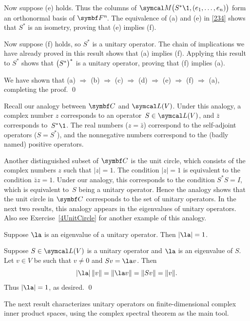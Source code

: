 Now suppose (e) holds. Thus the columns of $\M\paren[\big]{S^*\1, (e_1, \ldots, e_n)}$ form an orthonormal basis of $\FF{n}$. The equivalence of (a) and (e) in \ref{234} shows that $S^*$ is an isometry, proving that (e) implies (f).

Now suppose (f) holds, so $S^*$ is a unitary operator. The chain of implications we have already proved in this result shows that (a) implies (f). Applying this result to $S^*$ shows that $\paren[\big]{S^*}^*$ is a unitary operator, proving that (f) implies (a).

We have shown that (a) $\Rightarrow$ (b)  $\Rightarrow$ (c)  $\Rightarrow$ (d) $\Rightarrow$ (e) $\Rightarrow$ (f) $\Rightarrow$ (a), completing the proof.
\qed

Recall our analogy between $\C{}$ and $\L(V)$.  Under this analogy, a complex
number $z$ corresponds to an operator~$S \in \L(V)$, and $\bar{z}$ corresponds
to~$S^*\1$.  The real numbers \big($z = \bar{z}$\big) correspond to the self-adjoint operators \big($S = S^*$\big), and the
nonnegative numbers correspond to the (badly named) positive operators.

Another distinguished subset of $\C{}$ is the unit circle, which consists of the
complex numbers $z$ such that $|z| = 1$.  The condition $|z| = 1$ is equivalent to
the condition $\bar{z} z = 1$.  Under our analogy, this corresponds to the
condition $S^* S = I$, which is equivalent to~$S$ being a unitary operator.
Hence the analogy shows that the unit circle in $\C{}$ corresponds to the set of unitary operators. In the next two results, this analogy appears in the eigenvalues of unitary operators. Also see Exercise~\ref{4UnitCircle} for another example of this analogy.

{Suppose $\la$ is an eigenvalue of a unitary operator. Then $\abs{\la} = 1$.}

\proof
Suppose $S \in \L(V)$ is a unitary operator and $\la$ is an eigenvalue of $S$. Let $v \in V$ be such that $v \ne 0$ and $Sv = \la v$. Then
\[
\abs{\la} \, \norm{v} = \norm{\la v} = \norm{Sv} = \norm{v}.
\]
Thus $\abs{\la} = 1$, as desired.
\qed

The next result characterizes unitary operators on finite-dimensional complex inner product spaces, using the complex spectral theorem as the main tool.


